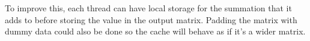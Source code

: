 \documentclass{article}
\begin{document}
\begin{enumerate}
          To improve this, each thread can have local storage for the summation that it adds to before storing the value in the output matrix. Padding the matrix with dummy data could also be done so the cache will behave as if it's a wider matrix.
\end{enumerate}
\end{document}
